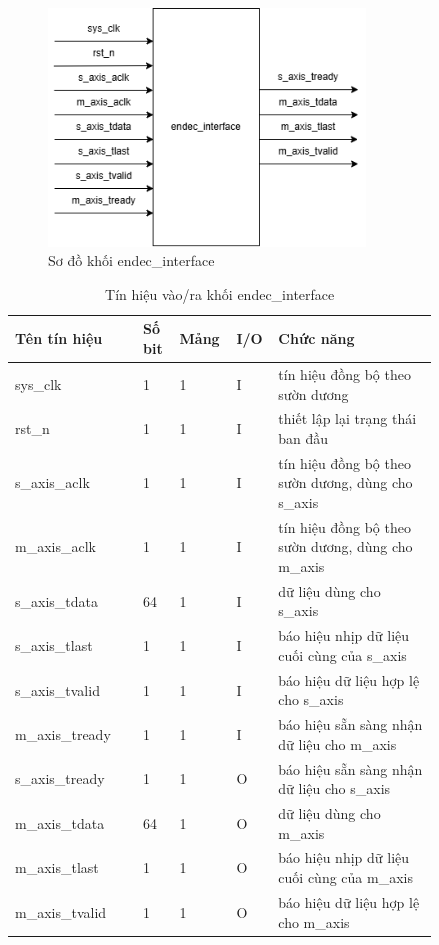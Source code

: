 \documentclass[../DoAn.tex]{subfiles}
\begin{document}
\begin{figure}[H]
    \centering
    \includegraphics[width=0.75\textwidth, height=0.2\textheight, keepaspectratio]{Hinhve/Chuong 4/endec interface.png}
    \caption{Sơ đồ khối endec\_interface}
\end{figure}

\begin{table}[H]
\centering
    \caption{Tín hiệu vào/ra khối endec\_interface}
    \begin{tabular}{|p{0.28\linewidth}|p{0.08\linewidth}|p{0.08\linewidth}|p{0.05\linewidth}|p{0.35\linewidth}|}
        \hline
        \textbf{Tên tín hiệu} & \textbf{Số bit}  & \textbf{Mảng}     & \textbf{I/O}   & \textbf{Chức năng} \\ \hline\hline
        sys\_clk  & 1   & 1     & I     & tín hiệu đồng bộ theo sườn dương \\ \hline
        rst\_n    & 1   & 1     & I     & thiết lập lại trạng thái ban đầu\\ \hline
        s\_axis\_aclk  & 1   & 1     & I     & tín hiệu đồng bộ theo sườn dương, dùng cho s\_axis \\ \hline
        m\_axis\_aclk  & 1   & 1     & I     & tín hiệu đồng bộ theo sườn dương, dùng cho m\_axis \\ \hline
        s\_axis\_tdata  & 64   & 1     & I     & dữ liệu dùng cho s\_axis \\ \hline
        s\_axis\_tlast  & 1   & 1     & I     & báo hiệu nhịp dữ liệu cuối cùng của s\_axis \\ \hline
        s\_axis\_tvalid  & 1   & 1     & I     & báo hiệu dữ liệu hợp lệ cho s\_axis \\ \hline
        m\_axis\_tready  & 1   & 1     & I     & báo hiệu sẵn sàng nhận dữ liệu cho m\_axis \\ \hline
        s\_axis\_tready  & 1   & 1     & O     & báo hiệu sẵn sàng nhận dữ liệu cho s\_axis \\ \hline
        m\_axis\_tdata  & 64   & 1     & O     & dữ liệu dùng cho m\_axis \\ \hline
        m\_axis\_tlast  & 1   & 1     & O     & báo hiệu nhịp dữ liệu cuối cùng của m\_axis \\ \hline
        m\_axis\_tvalid  & 1   & 1     & O     & báo hiệu dữ liệu hợp lệ cho m\_axis \\ \hline
        \end{tabular}
\end{table}
\end{document}
